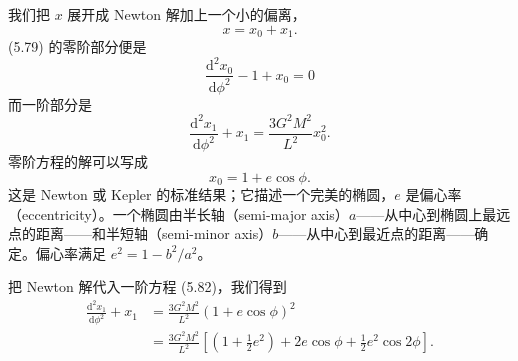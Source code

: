 我们把 $x$ 展开成 Newton 解加上一个小的偏离，
\begin{equation*}
x = x_0 + x_1.
\tag{5.80}
\end{equation*}
(5.79) 的零阶部分便是
\begin{equation*}
\frac{\mathrm{d}^2 x_0}{\mathrm{d}\phi^2} - 1 + x_0 = 0
\tag{5.81}
\end{equation*}
而一阶部分是
\begin{equation*}
\frac{\mathrm{d}^2 x_1}{\mathrm{d}\phi^2} + x_1 = \frac{3G^2M^2}{L^2}x_0^2.
\tag{5.82}
\end{equation*}
零阶方程的解可以写成
\begin{equation*}
x_0 = 1 + e\cos\phi.
\tag{5.83}
\end{equation*}
这是 Newton 或 Kepler 的标准结果；它描述一个完美的椭圆，$e$ 是偏心率（eccentricity）。一个椭圆由半长轴（semi-major axis）$a$——从中心到椭圆上最远点的距离——和半短轴（semi-minor axis）$b$——从中心到最近点的距离——确定。偏心率满足 $e^2 = 1 - b^2/a^2$。

把 Newton 解代入一阶方程 (5.82)，我们得到
\begin{align*}
\frac{\mathrm{d}^2 x_1}{\mathrm{d}\phi^2} + x_1 &= \frac{3G^2M^2}{L^2}(1+e\cos\phi)^2\\
&= \frac{3G^2M^2}{L^2}\left[\left(1+\frac{1}{2}e^2\right) + 2e\cos\phi + \frac{1}{2}e^2\cos 2\phi\right].
\tag{5.84}
\end{align*}

